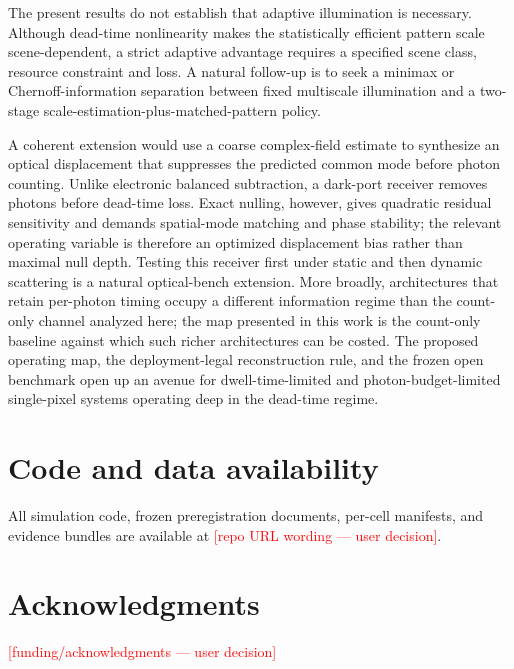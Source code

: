 \documentclass[10pt,twocolumn]{article}
\newcommand{\SPH}[1]{\textcolor{red}{[#1]}}   %
\begin{document}
The present results do not establish that adaptive illumination is
necessary. Although dead-time nonlinearity makes the statistically
efficient pattern scale scene-dependent, a strict adaptive advantage
requires a specified scene class, resource constraint and loss. A natural
follow-up is to seek a minimax or Chernoff-information separation between
fixed multiscale illumination and a two-stage
scale-estimation-plus-matched-pattern policy.

A coherent extension would use a coarse complex-field estimate to
synthesize an optical displacement that suppresses the predicted common
mode before photon counting. Unlike electronic balanced subtraction, a
dark-port receiver removes photons before dead-time loss. Exact nulling,
however, gives quadratic residual sensitivity and demands spatial-mode
matching and phase stability; the relevant operating variable is
therefore an optimized displacement bias rather than maximal null depth.
Testing this receiver first under static and then dynamic scattering is a
natural optical-bench extension. More broadly, architectures that retain
per-photon timing \cite{rapp2019deadtime,rapp2021highflux} occupy a different
information regime than the count-only channel analyzed here; the map
presented in this work is the count-only baseline against which such
richer architectures can be costed. The proposed operating map, the
deployment-legal reconstruction rule, and the frozen open benchmark open
up an avenue for dwell-time-limited and photon-budget-limited
single-pixel systems operating deep in the dead-time regime.

\section*{Code and data availability}
All simulation code, frozen preregistration documents, per-cell manifests,
and evidence bundles are available at \SPH{repo URL wording — user decision}.

\section*{Acknowledgments}
\SPH{funding/acknowledgments — user decision}



\end{document}
